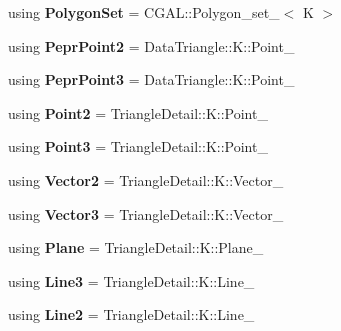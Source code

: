 \begin{DoxyCompactItemize}
using {\bfseries Polygon\+Set} = C\+G\+A\+L\+::\+Polygon\+\_\+set\+\_$<$ K $>$
\item 
\mbox{\label{classpepr3d_1_1_triangle_detail_afd25e5b8b0ca3a320f8de2f1233e60bd}} 
using {\bfseries Pepr\+Point2} = Data\+Triangle\+::\+K\+::\+Point\+\_
\item 
\mbox{\label{classpepr3d_1_1_triangle_detail_ab41625f7067e442f5840dc1ab8bcf2c4}} 
using {\bfseries Pepr\+Point3} = Data\+Triangle\+::\+K\+::\+Point\+\_
\item 
\mbox{\label{classpepr3d_1_1_triangle_detail_ab85cd57fea1decf01a3afe6fbe3ee135}} 
using {\bfseries Point2} = Triangle\+Detail\+::\+K\+::\+Point\+\_
\item 
\mbox{\label{classpepr3d_1_1_triangle_detail_a575c3b3f3196a6f23b1944eeb628813a}} 
using {\bfseries Point3} = Triangle\+Detail\+::\+K\+::\+Point\+\_
\item 
\mbox{\label{classpepr3d_1_1_triangle_detail_afe6926469de5e0dec620a0b640b1968a}} 
using {\bfseries Vector2} = Triangle\+Detail\+::\+K\+::\+Vector\+\_
\item 
\mbox{\label{classpepr3d_1_1_triangle_detail_a61a5b3b8f778b46b50f6d01d62de8a49}} 
using {\bfseries Vector3} = Triangle\+Detail\+::\+K\+::\+Vector\+\_
\item 
\mbox{\label{classpepr3d_1_1_triangle_detail_ac51978cae21325ae859138c55c9b1f24}} 
using {\bfseries Plane} = Triangle\+Detail\+::\+K\+::\+Plane\+\_
\item 
\mbox{\label{classpepr3d_1_1_triangle_detail_abedc3bea984b7db652cb05453bec6ee8}} 
using {\bfseries Line3} = Triangle\+Detail\+::\+K\+::\+Line\+\_
\item 
\mbox{\label{classpepr3d_1_1_triangle_detail_a6b06b451a0da04ecbc856b7f47fbeb25}} 
using {\bfseries Line2} = Triangle\+Detail\+::\+K\+::\+Line\+\_
\item 

\end{DoxyCompactItemize}
